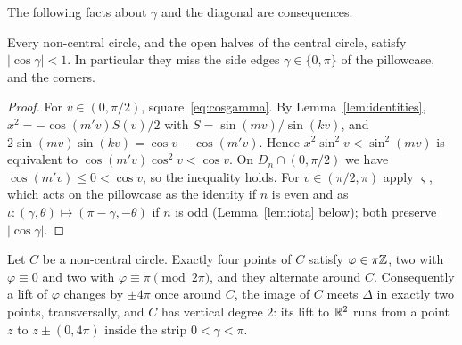 The following facts about $\gamma$ and the diagonal are consequences.

\begin{proposition}\label{prop:edges}
Every non-central circle, and the open halves of the central circle, satisfy $|\cos\gamma|<1$. In particular they
miss the side edges $\gamma\in\{0,\pi\}$ of the pillowcase, and the corners.
\end{proposition}

\begin{proof}
For $v\in(0,\pi/2)$, square~\eqref{eq:cosgamma}. By Lemma~\ref{lem:identities}, $x^2=-\cos(m'v)S(v)/2$ with
$S=\sin(mv)/\sin(kv)$, and $2\sin(mv)\sin(kv)=\cos v-\cos(m'v)$. Hence $x^2\sin^2v<\sin^2(mv)$ is equivalent to
$\cos(m'v)\cos^2v<\cos v$. On $D_n\cap(0,\pi/2)$ we have $\cos(m'v)\le0<\cos v$, so the inequality holds. For $v\in(\pi/2,\pi)$
apply $\varsigma$, which acts on the pillowcase as the identity if $n$ is even and as $\iota\colon(\gamma,\theta)\mapsto(\pi-\gamma,-\theta)$
if $n$ is odd (Lemma~\ref{lem:iota} below); both preserve $|\cos\gamma|$.
\end{proof}

\begin{proposition}\label{prop:noncentralcrossings}
Let $C$ be a non-central circle. Exactly four points of $C$ satisfy $\varphi\in\pi\mathbb{Z}$, two with $\varphi\equiv0$ and two with
$\varphi\equiv\pi\pmod{2\pi}$, and they alternate around $C$. Consequently a lift of $\varphi$ changes by $\pm4\pi$ once around
$C$, the image of $C$ meets $\Delta$ in exactly two points, transversally, and $C$ has vertical degree $2$: its lift to
$\mathbb{R}^2$ runs from a point $z$ to $z\pm(0,4\pi)$ inside the strip $0<\gamma<\pi$.
\end{proposition}

